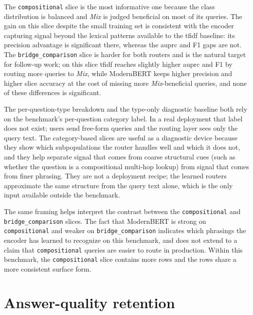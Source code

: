 \documentclass[english, bibtex]{kththesis}               %
\numberwithin{listing}{chapter}
\begin{document}
The \texttt{compositional} slice is the most informative one because the class distribution is balanced and \emph{Mix} is judged beneficial on most of its queries. The gain on this slice despite the small training set is consistent with the encoder capturing signal beyond the lexical patterns available to the \gls{tfidf} baseline: its precision advantage is significant there, whereas the \gls{auprc} and F1 gaps are not. The \texttt{bridge\_comparison} slice is harder for both routers and is the natural target for follow-up work; on this slice \gls{tfidf} reaches slightly higher \gls{auprc} and F1 by routing more queries to \emph{Mix}, while ModernBERT keeps higher precision and higher slice accuracy at the cost of missing more \emph{Mix}-beneficial queries, and none of these differences is significant.

The per-question-type breakdown and the type-only diagnostic baseline both rely on the benchmark's per-question category label. In a real deployment that label does not exist; users send free-form queries and the routing layer sees only the query text. The category-based slices are useful as a diagnostic device because they show which subpopulations the router handles well and which it does not, and they help separate signal that comes from coarse structural cues (such as whether the question is a compositional multi-hop lookup) from signal that comes from finer phrasing. They are not a deployment recipe; the learned routers approximate the same structure from the query text alone, which is the only input available outside the benchmark.

The same framing helps interpret the contrast between the \texttt{compositional} and \texttt{bridge\_comparison} slices. The fact that ModernBERT is strong on \texttt{compositional} and weaker on \texttt{bridge\_comparison} indicates which phrasings the encoder has learned to recognize on this benchmark, and does not extend to a claim that \texttt{compositional} queries are easier to route in production. Within this benchmark, the \texttt{compositional} slice contains more rows and the rows share a more consistent surface form.

\section{Answer-quality retention}
\label{sec:resultsRetention}
\end{document}
